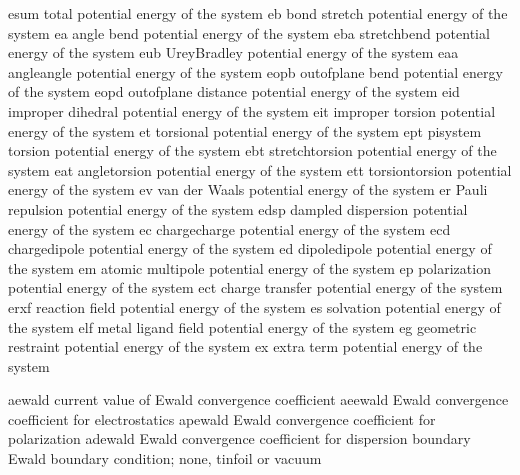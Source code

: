\documentclass[letterpaper,11pt,english]{sphinxmanual}
\begin{document}

\begin{sphinxVerbatim}[commandchars=\\\{\}]
esum            total potential energy of the system
eb              bond stretch potential energy of the system
ea              angle bend potential energy of the system
eba             stretch\PYGZhy{}bend potential energy of the system
eub             Urey\PYGZhy{}Bradley potential energy of the system
eaa             angle\PYGZhy{}angle potential energy of the system
eopb            out\PYGZhy{}of\PYGZhy{}plane bend potential energy of the system
eopd            out\PYGZhy{}of\PYGZhy{}plane distance potential energy of the system
eid             improper dihedral potential energy of the system
eit             improper torsion potential energy of the system
et              torsional potential energy of the system
ept             pi\PYGZhy{}system torsion potential energy of the system
ebt             stretch\PYGZhy{}torsion potential energy of the system
eat             angle\PYGZhy{}torsion potential energy of the system
ett             torsion\PYGZhy{}torsion potential energy of the system
ev              van der Waals potential energy of the system
er              Pauli repulsion potential energy of the system
edsp            dampled dispersion potential energy of the system
ec              charge\PYGZhy{}charge potential energy of the system
ecd             charge\PYGZhy{}dipole potential energy of the system
ed              dipole\PYGZhy{}dipole potential energy of the system
em              atomic multipole potential energy of the system
ep              polarization potential energy of the system
ect             charge transfer potential energy of the system
erxf            reaction field potential energy of the system
es              solvation potential energy of the system
elf             metal ligand field potential energy of the system
eg              geometric restraint potential energy of the system
ex              extra term potential energy of the system
\end{sphinxVerbatim}


\begin{sphinxVerbatim}[commandchars=\\\{\}]
aewald          current value of Ewald convergence coefficient
aeewald         Ewald convergence coefficient for electrostatics
apewald         Ewald convergence coefficient for polarization
adewald         Ewald convergence coefficient for dispersion
boundary        Ewald boundary condition; none, tinfoil or vacuum
\end{sphinxVerbatim}
\end{document}
